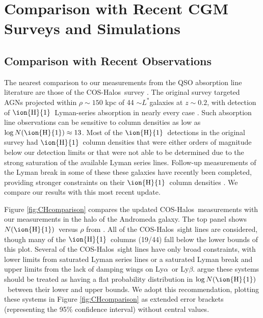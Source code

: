 \documentclass[12pt,preprint]{aastex6}
\newcommand{\HI}{\ensuremath{\mbox{\ion{H}{1}}}}
\newcommand{\lya}{Ly$\alpha$\relax}
\newcommand{\lyb}{Ly$\beta$\relax}
\newcommand{\NHI}{\ensuremath{N(\mbox{\ion{H}{1}})}\relax}
\newcommand{\logNHI}{\ensuremath{\log N(\mbox{\ion{H}{1}})}\relax}
\newcommand{\lstar}{\ensuremath{L^*}}
\newcommand{\coshalos}{COS-Halos}
\begin{document}
\section{Comparison with Recent CGM Surveys and Simulations}
\label{sec:comparisons}

\subsection{Comparison with Recent Observations}
\label{sec:obscomparison}

The nearest comparison to our measurements from the QSO absorption
line literature are those of the \coshalos\ survey
\citep{tumlinson2011, tumlinson2013, prochaska2017}. The original
survey targeted AGNs projected within $\rho \sim 150$ kpc of 44
$\sim$\lstar galaxies at $z\sim0.2$, with detection of \HI\
Lyman-series absorption in nearly every case \citep[40/44;
see][]{tumlinson2013}. Such absorption line observations can be
sensitive to column densities as low as $\logNHI \approx 13$. Most of
the \HI\ detections in the original survey had \HI\ column densities
that were either orders of magnitude below our detection limits or
that were not able to be determined due to the strong saturation of
the available Lyman series lines. Follow-up measurements of the Lyman
break in some of these these galaxies have recently been completed,
providing stronger constraints on their \HI\ column densities
\citep{prochaska2017}. We compare our results with this most recent
update.

Figure \ref{fig:CHcomparison} compares the updated \coshalos\
measurements with our measurements in the halo of the Andromeda
galaxy. The top panel shows \NHI\ versus $\rho$ from
\citet{prochaska2017}. All of the \coshalos\ sight lines are
considered, though many of the \HI\ columns (19/44) fall below the
lower bounds of this plot. Several of the \coshalos\ sight lines have
only broad constraints, with lower limits from saturated Lyman series
lines or a saturated Lyman break and upper limits from the lack of
damping wings on \lya\ or \lyb. \citeauthor{prochaska2017} argue these
systems should be treated as having a flat probability distribution in
\logNHI\ between their lower and upper bounds. We adopt this
recommendation, plotting these systems in Figure
\ref{fig:CHcomparison} as extended error brackets (representing the
95\% confidence interval) without central values.
\end{document}
